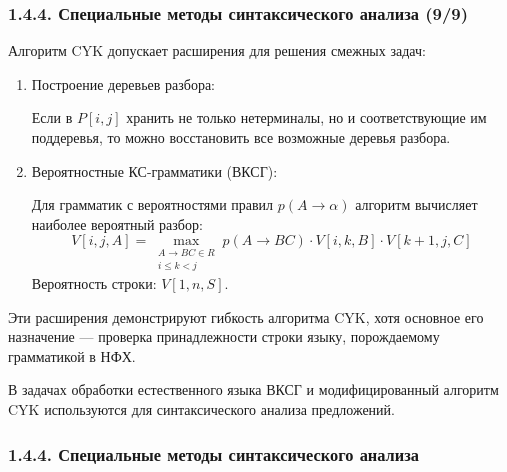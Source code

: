 \begin{frame}
\frametitle{1.4.4. Специальные методы синтаксического анализа (9/9)}
\begin{digress}
Алгоритм CYK допускает расширения для решения смежных задач:

\begin{enumerate}
    \item Построение деревьев разбора:
    
    Если в $P[i,j]$ хранить не только нетерминалы, но и соответствующие им поддеревья, то можно восстановить все возможные деревья разбора.
    
    \item Вероятностные КС-грамматики (ВКСГ):
    
    Для грамматик с вероятностями правил $p(A \to \alpha)$ алгоритм вычисляет наиболее вероятный разбор:
    \[
    V[i,j,A] = \max_{\substack{A \to BC \in R \\ i \leq k < j}} p(A \to BC) \cdot V[i,k,B] \cdot V[k+1,j,C]
    \]
    Вероятность строки: $V[1,n,S]$.
\end{enumerate}

\begin{remark}
    Эти расширения демонстрируют гибкость алгоритма CYK, хотя основное его назначение — проверка принадлежности строки языку, порождаемому грамматикой в НФХ.
\end{remark}

\begin{example}
    В задачах обработки естественного языка ВКСГ и модифицированный алгоритм CYK используются для синтаксического анализа предложений.
\end{example}

\end{digress}
\end{frame}


\subsubsection{1.4.4. Специальные методы синтаксического анализа}
\label{1.4.4.}

